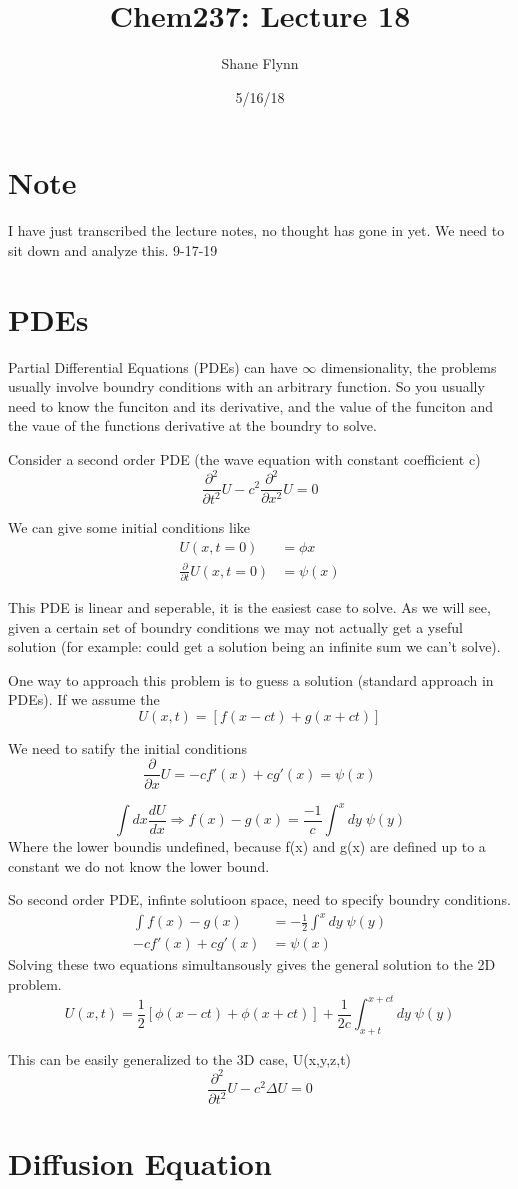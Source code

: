 \documentclass{article}
\title{Chem237: Lecture 18}
\date{5/16/18}
\author{Shane Flynn}
\newcommand{\be}{\begin{equation}}
\newcommand{\ee}{\end{equation}}
\newcommand{\pd}{\partial}
\newcommand{\half}{\frac{1}{2}}
\newcommand{\prt}{\frac{\pd}{\pd t}}
\newcommand{\prts}{\frac{\pd^2}{\pd t^2}}
\newcommand{\prx}{\frac{\pd}{\pd x}}
\newcommand{\prxs}{\frac{\pd^2}{\pd x^2}}
\begin{document}
\maketitle

\section{Note}
I have just transcribed the lecture notes, no thought has gone in yet. We need to sit down and analyze this. 9-17-19

\section{PDEs}
Partial Differential Equations (PDEs) can have $\infty$ dimensionality, the problems usually involve boundry conditions with an arbitrary function. 
So you usually need to know the funciton and its derivative, and the value of the funciton and the vaue of the functions derivative at the boundry to solve. 

Consider a second order PDE (the wave equation with constant coefficient c)
\be
\prts U - c^2 \prxs U = 0 
\ee

We can give some initial conditions like 
\be
\begin{split}
    U(x,t=0) &= \phi x\\
    \prt U (x,t=0) &= \psi(x)
\end{split}
\ee

This PDE is linear and seperable, it is the easiest case to solve.
As we will see, given a certain set of boundry conditions we may not actually get a yseful solution (for example: could get a solution being an infinite sum we can't solve). 

One way to approach this problem is to guess a solution (standard approach in PDEs). 
If we assume the 
\be
U(x,t)=\left[f(x-ct)+g(x+ct)\right]
\ee

We need to satify the initial conditions
\be
\prx U = -cf'(x)+cg'(x) = \psi(x)
\ee

\be
\int dx \frac{dU}{dx} \Rightarrow f(x) - g(x) = \frac{-1}{c} \int^x dy\;\psi(y)
\ee
Where the lower boundis undefined, because f(x) and g(x) are defined up to a constant we do not know the lower bound. 

So second order PDE, infinte solutioon space, need to specify boundry conditions. 
\be\begin{split}
    \int f(x) - g(x) &=-\half\int^x dy\;\psi(y) \\
    -cf'(x) + cg'(x) &= \psi(x)
\end{split}
\ee
Solving these two equations simultansously gives the general solution to the 2D problem. 
\be
U(x,t) = \half\left[\phi(x-ct)+\phi(x+ct)\right] + \frac{1}{2c} \int_{x+t}^{x+ct} dy \; \psi(y) 
\ee

This can be easily generalized to the 3D case, U(x,y,z,t)
\be
\prts U - c^2 \Delta U = 0
\ee


\section{Diffusion Equation}
\end{document}
